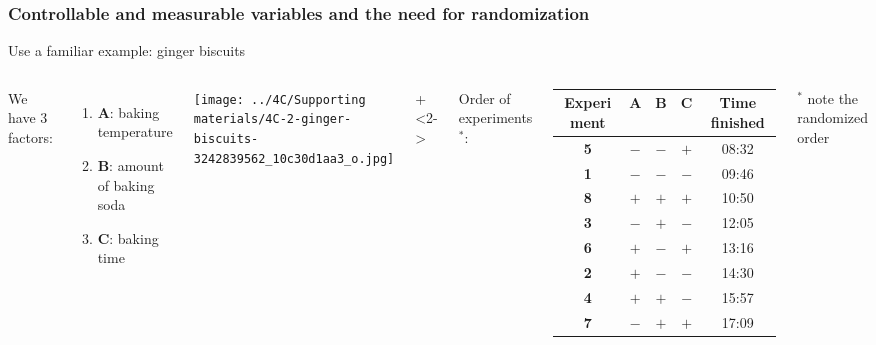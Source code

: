 \begin{frame}\frametitle{Controllable and measurable variables and the need for randomization}
	Use a familiar example: {\color{myOrange} ginger biscuits}
	\vspace{0.25cm}
	\begin{columns}[T]
			We have 3 factors:
			\begin{enumerate}
				\item	\textbf{A}: baking temperature
				\item	\textbf{B}: amount of baking soda
				\item	\textbf{C}: baking time
			\end{enumerate}
			
			
			\vspace{1cm}
			
			\texttt{[image: ../4C/Supporting materials/4C-2-ginger-biscuits-3242839562\_10c30d1aa3\_o.jpg]}
		
		
			
		
		
			\onslide+<2->{
			
				Order of experiments$^\ast$:
			
				\begin{tabulary}{\linewidth}{ccccc}\hline 
					\textbf{\relax Experiment } & \textbf{\relax A } & \textbf{\relax B } & \textbf{\relax C } & \textbf{\relax Time finished} \\
					\hline 
					\textbf{5} & \(-\) & \(-\) & \(+\) & 08:32\\
					\textbf{1} & \(-\) & \(-\) & \(-\) & 09:46\\
					\textbf{8} & \(+\) & \(+\) & \(+\) & 10:50\\
					\textbf{3} & \(-\) & \(+\) & \(-\) & 12:05\\
					\textbf{6} & \(+\) & \(-\) & \(+\) & 13:16\\
					\textbf{2} & \(+\) & \(-\) & \(-\) & 14:30\\
					\textbf{4} & \(+\) & \(+\) & \(-\) & 15:57\\
					\textbf{7} & \(-\) & \(+\) & \(+\) & 17:09\\
					
					 \hline
				\end{tabulary}
				
				\vspace{0.2cm}
				{\scriptsize $^\ast$ note the randomized order}
			}
			
			\vspace{0.75cm}
	\end{columns}	
\end{frame}

